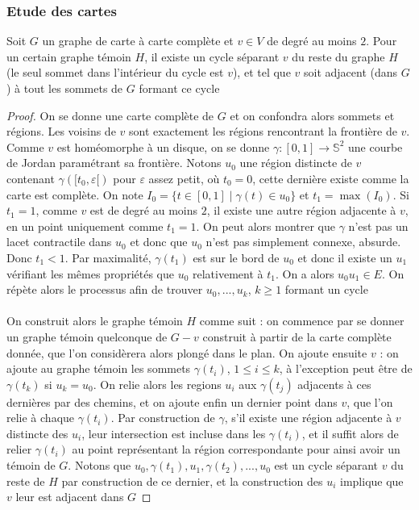\documentclass{scrartcl}
\begin{document}
\begin{flushleft}
\subsubsection{Etude des cartes}

\begin{lem}\label{cycleCompl}
    Soit $G$ un graphe de carte à carte complète et $v \in V$ de degré au moins $2$. Pour un certain graphe témoin $H$, il existe un cycle séparant $v$
    du reste du graphe $H$ (le seul sommet dans l'intérieur du cycle est $v$), et tel que $v$ soit adjacent (dans $G$) à tout les sommets
    de $G$ formant ce cycle
\end{lem}

\begin{proof}
    On se donne une carte complète de $G$ et on confondra alors sommets et régions. Les voisins de $v$ sont exactement les régions
    rencontrant la frontière de $v$. Comme $v$ est homéomorphe à un disque, on se donne $\gamma : [0, 1] \rightarrow \mathbb{S}^2$
    une courbe de Jordan paramétrant sa frontière. Notons $u_0$ une région distincte de $v$ contenant $\gamma([t_0, \varepsilon[)$ pour $\varepsilon$
    assez petit, où $t_0 = 0$, cette dernière existe comme la carte est complète. On note $I_0 = \{ t \in [0, 1] \mid \gamma(t) \in u_0 \}$
    et $t_1 = \max(I_0)$. Si $t_1 = 1$, comme $v$ est de degré au moins $2$, il existe une autre région adjacente à $v$, en un point uniquement
    comme $t_1 = 1$. On peut alors montrer que $\gamma$ n'est pas un lacet contractile dans $u_0$ et donc que $u_0$ n'est pas simplement connexe, absurde.
    Donc $t_1 < 1$. Par maximalité, $\gamma(t_1)$ est sur le bord de $u_0$ et donc il existe un $u_1$ vérifiant les mêmes propriétés que $u_0$
    relativement à $t_1$. On a alors $u_0u_1 \in E$. On répète alors le processus afin de trouver $u_0, ..., u_k$, $k \geq 1$ formant un cycle
    \\~\\
    On construit alors le graphe témoin $H$ comme suit : on commence par se donner un graphe témoin quelconque de $G - v$ construit à partir de la carte
    complète donnée, que l'on considèrera alors plongé dans le plan. On ajoute ensuite $v$ : on ajoute au graphe témoin les sommets
    $\gamma(t_i)$, $1 \leq i \leq k$, à l'exception peut être de $\gamma(t_k)$ si $u_k = u_0$. On relie alors les regions $u_i$ aux $\gamma(t_j)$
    adjacents à ces dernières par des chemins, et on ajoute enfin un dernier point dans $v$, que l'on relie à chaque $\gamma(t_i)$.
    Par construction de $\gamma$, s'il existe une région adjacente à $v$ distincte des $u_i$, leur intersection est incluse
    dans les $\gamma(t_i)$, et il suffit alors de relier $\gamma(t_i)$ au point représentant la région correspondante pour ainsi avoir
    un témoin de $G$. Notons que $u_0, \gamma(t_1), u_1, \gamma(t_2), ..., u_0$ est un cycle séparant $v$ du reste de $H$ par construction de ce dernier,
    et la construction des $u_i$ implique que $v$ leur est adjacent dans $G$
\end{proof}


\end{flushleft}
\end{document}
